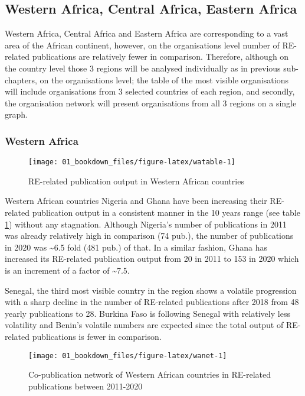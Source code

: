 \documentclass[12pt,twoside]{report}
\begin{document}
\hypertarget{western-africa-central-africa-eastern-africa}{%
\subsection{Western Africa, Central Africa, Eastern Africa}\label{western-africa-central-africa-eastern-africa}}

Western Africa, Central Africa and Eastern Africa are corresponding to a vast area of the African continent, however, on the organisations level number of RE-related publications are relatively fewer in comparison. Therefore, although on the country level those 3 regions will be analysed individually as in previous sub-chapters, on the organisations level; the table of the most visible organisations will include organisations from 3 selected countries of each region, and secondly, the organisation network will present organisations from all 3 regions on a single graph.

\hypertarget{western-africa}{%
\subsubsection{Western Africa}\label{western-africa}}

\begin{figure}
\texttt{[image: 01\_bookdown\_files/figure-latex/watable-1]} \caption{RE-related publication output in Western African countries}\label{fig:watable}
\end{figure}

Western African countries Nigeria and Ghana have been increasing their RE-related publication
output in a consistent manner in the 10 years range (see table \ref{fig:watable}) without any stagnation. Although Nigeria's number of publications in 2011 was already relatively high in comparison (74 pub.), the number of publications in 2020 was \textasciitilde6.5 fold (481 pub.) of that. In a similar fashion, Ghana has increased its RE-related publication output from 20 in 2011 to 153 in 2020 which is an increment of a factor of \textasciitilde7.5.

Senegal, the third most visible country in the region shows a volatile progression with a sharp decline in the number of RE-related publications after 2018 from 48 yearly publications to 28. Burkina Faso is following Senegal with relatively less volatility and Benin's volatile numbers are expected since the total output of RE-related publications is fewer in comparison.

\begin{figure}
\texttt{[image: 01\_bookdown\_files/figure-latex/wanet-1]} \caption{Co-publication network of Western African countries in RE-related publications between 2011-2020}\label{fig:wanet}
\end{figure}
\end{document}
